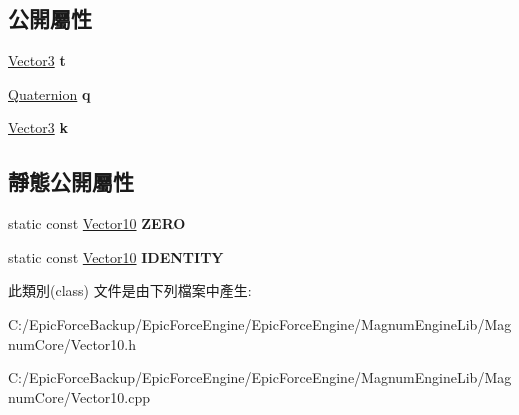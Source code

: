 \subsection*{公開屬性}
\begin{DoxyCompactItemize}
\item 
\hyperlink{class_magnum_1_1_vector3}{Vector3} {\bfseries t}\hypertarget{class_magnum_1_1_vector10_a9833d82bfb164df1e56456470d63b600}{}\label{class_magnum_1_1_vector10_a9833d82bfb164df1e56456470d63b600}

\item 
\hyperlink{class_magnum_1_1_quaternion}{Quaternion} {\bfseries q}\hypertarget{class_magnum_1_1_vector10_a3c5f85e560c856d93bfe9677466b68e2}{}\label{class_magnum_1_1_vector10_a3c5f85e560c856d93bfe9677466b68e2}

\item 
\hyperlink{class_magnum_1_1_vector3}{Vector3} {\bfseries k}\hypertarget{class_magnum_1_1_vector10_a138be88f5fedbc09c3ee87d6763c650a}{}\label{class_magnum_1_1_vector10_a138be88f5fedbc09c3ee87d6763c650a}

\end{DoxyCompactItemize}
\subsection*{靜態公開屬性}
\begin{DoxyCompactItemize}
\item 
static const \hyperlink{class_magnum_1_1_vector10}{Vector10} {\bfseries Z\+E\+RO}\hypertarget{class_magnum_1_1_vector10_a56a8397508b66cc44365abf7ddea2771}{}\label{class_magnum_1_1_vector10_a56a8397508b66cc44365abf7ddea2771}

\item 
static const \hyperlink{class_magnum_1_1_vector10}{Vector10} {\bfseries I\+D\+E\+N\+T\+I\+TY}\hypertarget{class_magnum_1_1_vector10_aa885cacb37f240f8c59a45c5c7b8a9f2}{}\label{class_magnum_1_1_vector10_aa885cacb37f240f8c59a45c5c7b8a9f2}

\end{DoxyCompactItemize}


此類別(class) 文件是由下列檔案中產生\+:\begin{DoxyCompactItemize}
\item 
C\+:/\+Epic\+Force\+Backup/\+Epic\+Force\+Engine/\+Epic\+Force\+Engine/\+Magnum\+Engine\+Lib/\+Magnum\+Core/Vector10.\+h\item 
C\+:/\+Epic\+Force\+Backup/\+Epic\+Force\+Engine/\+Epic\+Force\+Engine/\+Magnum\+Engine\+Lib/\+Magnum\+Core/Vector10.\+cpp\end{DoxyCompactItemize}
